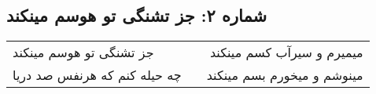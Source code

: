 \begin{center}
\section*{شماره ۲: جز تشنگی تو هوسم مینکند}
\label{sec:002}
\begin{longtable}{l p{0.5cm} r}
جز تشنگی تو هوسم مینکند
&&
میمیرم و سیرآب کسم مینکند
\\
چه حیله کنم که هرنفس صد دریا
&&
مینوشم و میخورم بسم مینکند
\\
\end{longtable}
\end{center}
